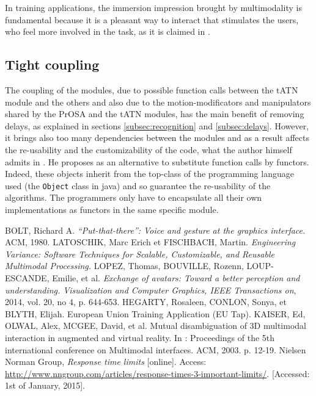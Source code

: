 \documentclass[a4paper]{article}
\begin{document}
In training applications, the immersion impression brought by multimodality is fundamental because it is a pleasant way to interact that stimulates the users, who feel more involved in the task, as it is claimed in \cite{eutap}. 

\subsection{Tight coupling}
The coupling of the modules, due to possible function calls between the tATN module and the others and also due to the motion-modificators and manipulators shared by the PrOSA and the tATN modules, has the main benefit of removing delays, as explained in sections \ref{subsec:recognition} and \ref{subsec:delays}. However, it brings also too many dependencies between the modules and as a result affects the re-usability and the customizability of the code, what the author himself admits in \cite{hcii}. He proposes as an alternative to substitute function calls by functors. Indeed, these objects inherit from the top-class of the programming language used (the \texttt{Object} class in java) and so guarantee the re-usability of the algorithms. The programmers only have to encapsulate all their own implementations as functors in the same specific module. 

\begin{thebibliography}{1}
	 BOLT, Richard A. \textit{“Put-that-there”: Voice and gesture at the graphics interface.} ACM, 1980.
	 LATOSCHIK, Marc Erich et FISCHBACH, Martin. \textit{Engineering Variance: Software Techniques for Scalable, Customizable, and Reusable Multimodal Processing.}
	 LOPEZ, Thomas, BOUVILLE, Rozenn, LOUP-ESCANDE, Emilie, et al. \textit{Exchange of avatars: Toward a better perception and understanding. Visualization and Computer Graphics, IEEE Transactions on}, 2014, vol. 20, no 4, p. 644-653.
	 HEGARTY, Rosaleen, CONLON, Sonya, et BLYTH, Elijah. European Union Training Application (EU Tap).
	 KAISER, Ed, OLWAL, Alex, MCGEE, David, et al. Mutual disambiguation of 3D multimodal interaction in augmented and virtual reality. In : Proceedings of the 5th international conference on Multimodal interfaces. ACM, 2003. p. 12-19.
	 Nielsen Norman Group, \textit{Response time limits} [online]. Access: \url{http://www.nngroup.com/articles/response-times-3-important-limits/}. [Accessed: 1st of January, 2015].
\end{thebibliography}
\end{document}
